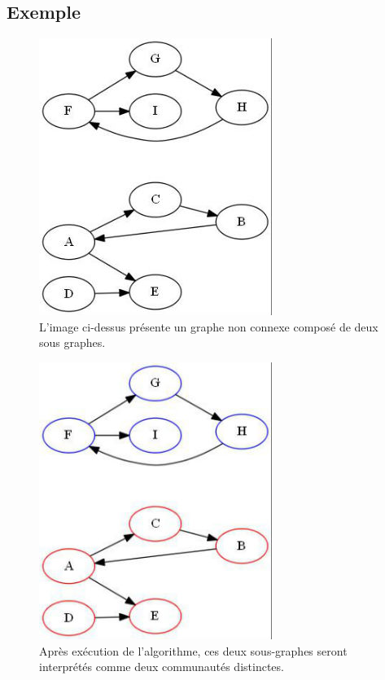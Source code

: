 \documentclass[12pt, oneside]{article}
\begin{document}
\subsection{Exemple}
\begin{figure}[!h]
    \centering
    \includegraphics[scale=0.7,trim=3 3 3 3,clip]{2_2_0}
    \caption{L'image ci-dessus présente un graphe non connexe composé de deux sous graphes.}
\end{figure}

\begin{figure}[!h]
    \centering
    \includegraphics[scale=0.7,trim=3 3 3 3,clip]{2_2_1}
    \caption{Après exécution de l'algorithme, ces deux sous-graphes seront interprétés comme deux communautés distinctes.}
\end{figure}
\end{document}

